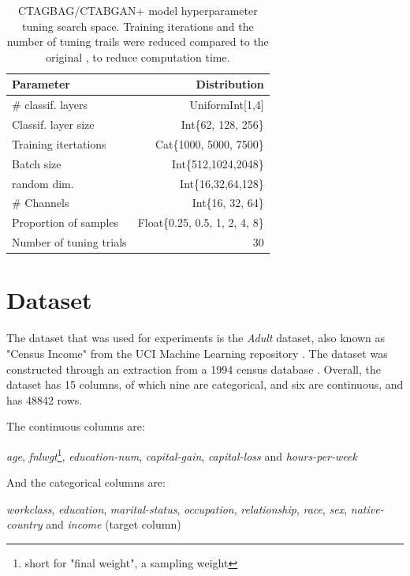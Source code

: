 \begin{table}[h]
	\centering
	\begin{tabular}{lr}
		\toprule
		Parameter               & Distribution                   \\
		\midrule
		\# classif. layers      & UniformInt[1,4]                \\
		Classif. layer size     & Int\{62, 128, 256\}            \\
		Training itertations    & Cat\{1000, 5000, 7500\}        \\
		Batch size              & Int\{512,1024,2048\}           \\
		random dim.             & Int\{16,32,64,128\}            \\
		\# Channels             & Int\{16, 32, 64\}              \\
		Proportion of samples   & Float\{0.25, 0.5, 1, 2, 4, 8\} \\
		\midrule
		Number of tuning trials & 30                             \\
		\bottomrule
	\end{tabular}
	\caption[CTAGBAG(+) Hyperparameter Search Space]{CTAGBAG/CTABGAN+ model hyperparameter tuning search space. Training iterations and the number of tuning trails were reduced compared to the original \cite{kotelnikov2022TabDDPMModellingTabular}, to reduce computation time.}
	\label{tab:ctabgan_tune}
\end{table}

\section{Dataset}
\label{ch:methods-datasets}

The dataset that was used for experiments is the \textit{Adult} dataset, also known as "Census Income" from the UCI Machine Learning repository \cite{Dua:2019}.
The dataset was constructed through an extraction from a 1994 census database \cite{kohavi1996ScalingAccuracyNaiveBayes}.
Overall, the dataset has 15 columns, of which nine are categorical, and six are continuous, and has 48842 rows.

The continuous columns are:


\textit{age}, \textit{fnlwgt}\footnote{short for "final weight", a sampling weight}, \textit{education-num}, \textit{capital-gain}, \textit{capital-loss} and \textit{hours-per-week}


And the categorical columns are:


\textit{workclass}, \textit{education}, \textit{marital-status}, \textit{occupation}, \textit{relationship}, \textit{race}, \textit{sex}, \textit{native-country} and \textit{income} (target column)



